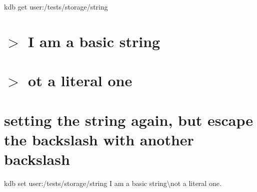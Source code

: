 kdb get \textquotesingle{}user\+:/tests/storage/string\textquotesingle{} \hypertarget{autotoc_md635_autotoc_md685}{}\section{$>$ I am a basic string}\label{autotoc_md635_autotoc_md685}
\hypertarget{autotoc_md635_autotoc_md686}{}\section{$>$ ot a literal one}\label{autotoc_md635_autotoc_md686}
\hypertarget{autotoc_md635_autotoc_md687}{}\section{setting the string again, but escape the backslash with another backslash}\label{autotoc_md635_autotoc_md687}
kdb set \textquotesingle{}user\+:/tests/storage/string\textquotesingle{} \textquotesingle{}I am a basic string\textbackslash{}not a literal one.\textquotesingle{}

